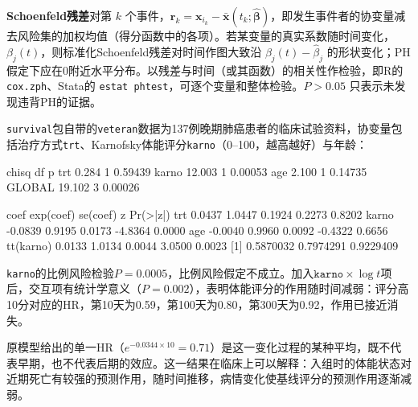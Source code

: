 \textbf{Schoenfeld残差}\quad 对第 $k$ 个事件，$\bm r_k=\bm x_{i_k}-\bar{\bm x}(t_k;\widehat{\bm\beta})$，即发生事件者的协变量减去风险集的加权均值（得分函数中的各项）。若某变量的真实系数随时间变化，$\beta_j(t)$，则标准化Schoenfeld残差对时间作图大致沿 $\beta_j(t)-\widehat\beta_j$ 的形状变化；PH假定下应在0附近水平分布。以残差与时间（或其函数）的相关性作检验，即R的 \texttt{cox.zph}、Stata的 \texttt{estat phtest}，可逐个变量和整体检验。$P>0.05$ 只表示未发现违背PH的证据。
\begin{sikao}[违背比例风险假定的实例]
\texttt{survival}包自带的\texttt{veteran}数据为137例晚期肺癌患者的临床试验资料，协变量包括治疗方式\texttt{trt}、Karnofsky体能评分\texttt{karno}（0--100，越高越好）与年龄：
\par\noindent
{}
\begin{routput}
        chisq df       p
trt     0.284  1 0.59439
karno  12.003  1 0.00053
age     2.100  1 0.14735
GLOBAL 19.102  3 0.00026

             coef exp(coef) se(coef)       z Pr(>|z|)
trt        0.0437    1.0447   0.1924  0.2273   0.8202
karno     -0.0839    0.9195   0.0173 -4.8364   0.0000
age       -0.0040    0.9960   0.0092 -0.4322   0.6656
tt(karno)  0.0133    1.0134   0.0044  3.0500   0.0023
[1] 0.5870032 0.7974291 0.9229409
\end{routput}
\texttt{karno}的比例风险检验$P=0.0005$，比例风险假定不成立。加入$\texttt{karno}\times\log t$项后，交互项有统计学意义（$P=0.002$），表明体能评分的作用随时间减弱：评分高10分对应的HR，第10天为0.59，第100天为0.80，第300天为0.92，作用已接近消失。

原模型给出的单一HR（$e^{-0.0344}=0.71$）是这一变化过程的某种平均，既不代表早期，也不代表后期的效应。这一结果在临床上可以解释：入组时的体能状态对近期死亡有较强的预测作用，随时间推移，病情变化使基线评分的预测作用逐渐减弱。
\end{sikao}
